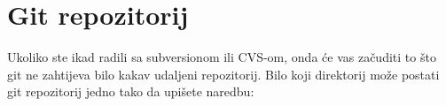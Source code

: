 \chapter*{Git repozitorij}

Ukoliko ste ikad radili sa subversionom ili CVS-om, onda će vas začuditi to što git ne zahtijeva bilo kakav udaljeni repozitorij. 
Bilo koji direktorij može postati git repozitorij jedno tako da upišete naredbu:


